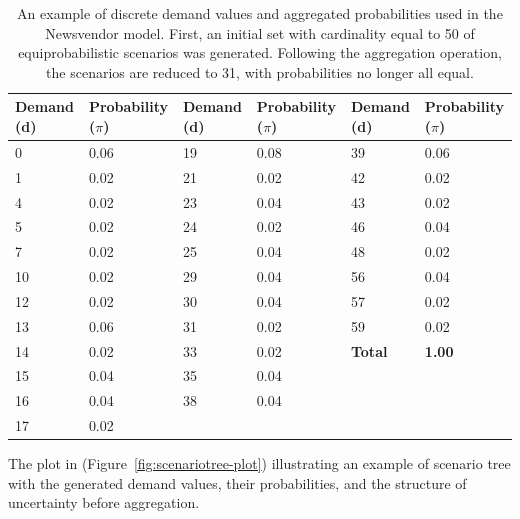 \documentclass[a4paper,12pt]{article}
\begin{document}
	\begin{table}[H]
		\centering
		\footnotesize %
		\label{tab:newsvendor-general}
		\renewcommand{\arraystretch}{1.1}
		\begin{tabular}{|@{\hskip 2pt}p{1.5cm}@{\hskip 2pt}|@{\hskip 2pt}p{2.0cm}@{\hskip 2pt}||@{\hskip 2pt}p{1.5cm}@{\hskip 2pt}|@{\hskip 2pt}p{2.0cm}@{\hskip 2pt}||@{\hskip 2pt}p{1.5cm}@{\hskip 2pt}|@{\hskip 2pt}p{2.0cm}@{\hskip 2pt}|}
			\hline
			\textbf{Demand (d)} & \textbf{Probability ($\pi$)} & \textbf{Demand (d)} & \textbf{Probability ($\pi$)} & \textbf{Demand (d)} & \textbf{Probability ($\pi$)} \\
			\hline
			0 & 0.06 & 19 & 0.08 & 39 & 0.06 \\
			1 & 0.02 & 21 & 0.02 & 42 & 0.02 \\
			4 & 0.02 & 23 & 0.04 & 43 & 0.02 \\
			5 & 0.02 & 24 & 0.02 & 46 & 0.04 \\
			7 & 0.02 & 25 & 0.04 & 48 & 0.02 \\
			10 & 0.02 & 29 & 0.04 & 56 & 0.04 \\
			12 & 0.02 & 30 & 0.04 & 57 & 0.02 \\
			13 & 0.06 & 31 & 0.02 & 59 & 0.02 \\
			14 & 0.02 & 33 & 0.02 & \textbf{Total} & \textbf{1.00} \\
			15 & 0.04 & 35 & 0.04 & & \\
			16 & 0.04 & 38 & 0.04 & & \\
			17 & 0.02 & & & & \\
			\hline
		\end{tabular}
		\caption{An example of discrete demand values and aggregated probabilities used in the Newsvendor model. First, an initial set with cardinality equal to 50 of equiprobabilistic scenarios was generated. Following the aggregation operation, the scenarios are reduced to 31, with probabilities no longer all equal.}
	\end{table}
	
	
	\noindent The plot in (Figure~\ref{fig:scenariotree-plot}) illustrating an example of scenario tree  with the generated demand values, their probabilities, and the structure of uncertainty before aggregation.
	
\end{document}

